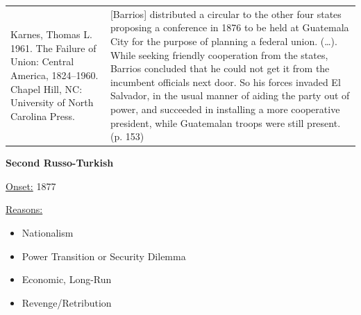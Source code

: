 {\begin{longtable}{p{}p{}}
\\
Karnes, Thomas L. 1961. The Failure of Union: Central America, 1824–1960. Chapel Hill, NC: University of North Carolina Press. & [Barrios] distributed a circular to the other four states proposing a conference in 1876 to be held at Guatemala City for the purpose of planning a federal union. (…). While seeking friendly cooperation from the states, Barrios concluded that he could not get it from the incumbent officials next door. So his forces invaded El Salvador, in the usual manner of aiding the party out of power, and succeeded in installing a more cooperative president, while Guatemalan troops were still present. (p. 153)
\\
\end{longtable}}
\clearpage
         \textbf{Second Russo-Turkish} 

          \underline{Onset:} 1877         

\underline{Reasons:}
\begin{itemize}
\item Nationalism
\item Power Transition or Security Dilemma
\item Economic, Long-Run
\item Revenge/Retribution
\end{itemize}

